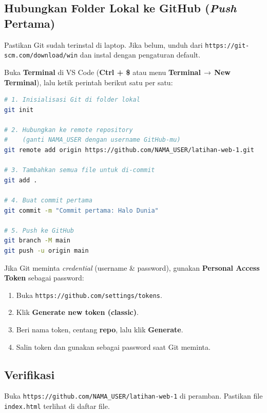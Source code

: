\subsection{Hubungkan Folder Lokal ke GitHub (\emph{Push} Pertama)}

\begin{peringatan}
Pastikan Git sudah terinstal di laptop. Jika belum, unduh dari \texttt{https://git-scm.com/download/win} dan instal dengan pengaturan default.
\end{peringatan}

Buka \textbf{Terminal} di VS Code (\textbf{Ctrl + \$} atau menu \textbf{Terminal\,$\rightarrow$\,New Terminal}), lalu ketik perintah berikut satu per satu:

\begin{lstlisting}[language=bash, caption={Perintah push pertama ke GitHub}, label={lst:m01-git-push}]
# 1. Inisialisasi Git di folder lokal
git init

# 2. Hubungkan ke remote repository
#    (ganti NAMA_USER dengan username GitHub-mu)
git remote add origin https://github.com/NAMA_USER/latihan-web-1.git

# 3. Tambahkan semua file untuk di-commit
git add .

# 4. Buat commit pertama
git commit -m "Commit pertama: Halo Dunia"

# 5. Push ke GitHub
git branch -M main
git push -u origin main
\end{lstlisting}

\begin{catatan}
Jika Git meminta \emph{credential} (username \& password), gunakan \textbf{Personal Access Token} sebagai password:
\begin{enumerate}
  \item Buka \texttt{https://github.com/settings/tokens}.
  \item Klik \textbf{Generate new token (classic)}.
  \item Beri nama token, centang \textbf{repo}, lalu klik \textbf{Generate}.
  \item Salin token dan gunakan sebagai password saat Git meminta.
\end{enumerate}
\end{catatan}

\subsection{Verifikasi}

Buka \texttt{https://github.com/NAMA\_USER/latihan-web-1} di peramban. Pastikan file \texttt{index.html} terlihat di daftar file.

